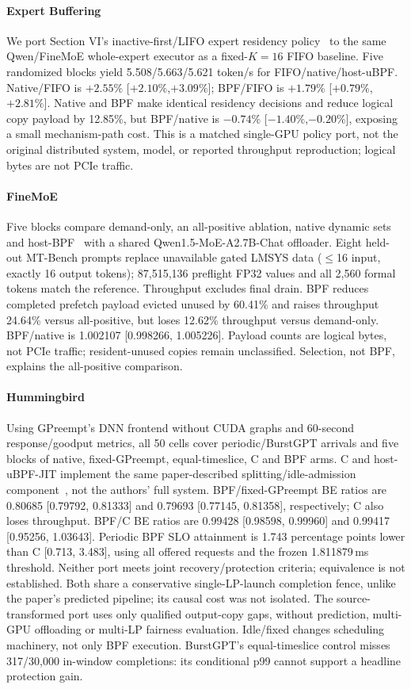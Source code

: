 \paragraph{Expert Buffering}
We port Section VI's inactive-first/LIFO expert residency policy~\cite{huang2023towards}
to the same Qwen/FineMoE whole-expert executor as a fixed-$K{=}16$ FIFO baseline.
Five randomized blocks yield 5.508/5.663/5.621 token/s for FIFO/native/host-uBPF.
Native/FIFO is $+2.55\%$ [$+2.10\%$,$+3.09\%$]; BPF/FIFO is
$+1.79\%$ [$+0.79\%$,$+2.81\%$]. Native and BPF make identical residency
decisions and reduce logical copy payload by 12.85\%, but BPF/native is
$-0.74\%$ [$-1.40\%$,$-0.20\%$], exposing a small mechanism-path cost.
This is a matched single-GPU policy port, not the original distributed system,
model, or reported throughput reproduction; logical bytes are not PCIe traffic.

\paragraph{FineMoE}
Five blocks compare demand-only, an all-positive ablation, native dynamic sets
and host-BPF~\cite{yu2026finemoe} with a shared Qwen1.5-MoE-A2.7B-Chat offloader.
Eight held-out MT-Bench prompts replace unavailable gated LMSYS data
($\leq$16 input, exactly 16 output tokens); 87,515,136 preflight FP32 values
and all 2,560 formal tokens match the reference. Throughput excludes final drain. BPF reduces completed prefetch
payload evicted unused by 60.41\% and raises throughput 24.64\% versus
all-positive, but loses 12.62\% throughput versus demand-only. BPF/native is
1.002107 [0.998266, 1.005226]. Payload counts are logical bytes, not PCIe traffic;
resident-unused copies remain unclassified. Selection, not BPF, explains the
all-positive comparison.

\paragraph{Hummingbird}
Using GPreempt's DNN frontend without CUDA graphs and 60-second response/goodput metrics,
all 50 cells cover periodic/BurstGPT arrivals and five blocks of native,
fixed-GPreempt, equal-timeslice, C and BPF arms.
C and host-uBPF-JIT implement the same paper-described splitting/idle-admission
component~\cite{hu2026hummingbird}, not the authors' full system.
BPF/fixed-GPreempt BE ratios are 0.80685 [0.79792, 0.81333] and
0.79693 [0.77145, 0.81358], respectively; C also loses throughput.
BPF/C BE ratios are 0.99428 [0.98598, 0.99960] and
0.99417 [0.95256, 1.03643].
Periodic BPF SLO attainment is 1.743 percentage points lower than C
[0.713, 3.483], using all offered requests and the frozen 1.811879\,ms threshold.
Neither port meets joint recovery/protection criteria; equivalence is not
established. Both share a conservative single-LP-launch completion fence,
unlike the paper's predicted pipeline; its causal cost was not isolated.
The source-transformed port uses only qualified output-copy gaps, without
prediction, multi-GPU offloading or multi-LP fairness evaluation.
Idle/fixed changes scheduling machinery, not only BPF execution. BurstGPT's
equal-timeslice control misses 317/30,000 in-window completions: its conditional
p99 cannot support a headline protection gain.

